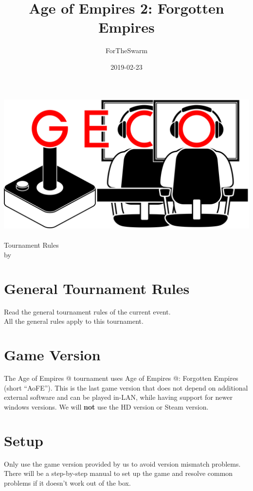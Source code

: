 \documentclass{article}
\title{Age of Empires 2: Forgotten Empires}
\author{ForTheSwarm}
\date{2019-02-23}
\makeatletter
\newcommand*{\rom}[1]{\expandafter\@slowromancap\romannumeral #1@}
\makeatother
\begin{document}
\makeatletter
\begin{titlepage}
\centering
\includegraphics[scale=0.075]{../img/GECo.png}\\
\vspace{1.2cm}
\LARGE \@title\\ Tournament Rules\\ \normalsize by \@author\\ \@date
\end{titlepage}
\makeatother


\clearpage

\tableofcontents
\clearpage

\section{General Tournament Rules}
Read the general tournament rules of the current event.\\
All the general rules apply to this tournament.

\section{Game Version}
The Age of Empires \rom{2} tournament uses Age of Empires \rom{2}: Forgotten Empires (short ``AoFE''). This is the last game version that does not depend on additional external software and can be played in-LAN, while having support for newer windows versions. We will \textbf{not} use the HD version or Steam version.

\section{Setup}
Only use the game version provided by us to avoid version mismatch problems. There will be a step-by-step manual to set up the game and resolve common problems if it doesn't work out of the box.
\end{document}
